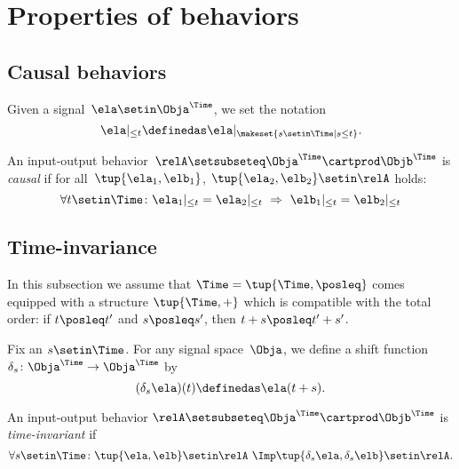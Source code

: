 
\section{Properties of behaviors}

\subsection{Causal behaviors}

Given a signal~$\ela \setin \Obja^\Time$, we set the notation
\begin{equation}
    \ela \vert_{\leq t} \definedas \ela \vert_{\makeset{ s \setin \Time \mid s \leq t}}.
\end{equation}

\begin{definition}\label{def:causal-io}
    An input-output behavior~$\relA \setsubseteq \Obja^\Time \cartprod \Objb^\Time$ is \emph{causal} if for all~$\tup{\ela_1, \elb_1}$, $\tup{\ela_2, \elb_2} \setin \relA$ holds:
    \begin{equation}
        \forall t \setin \Time\colon \ela_1 \vert_{ \leq t} = \ela_2 \vert_{ \leq t} \ \Rightarrow \ \elb_1 \vert_{ \leq t} = \elb_2 \vert_{ \leq t}
    \end{equation}
\end{definition}


\subsection{Time-invariance}

In this subsection we assume that $\Time = \tup{\Time, \posleq}$ comes equipped with a  structure $\tup{\Time, +}$ which is compatible with the total order: if $t \posleq t'$ and $s \posleq s'$, then $t + s \posleq t' + s'$.

Fix an $s \setin \Time$.
For any signal space~$\Obja$, we define a shift function~$\delta_s\colon \Obja^\Time \to \Obja^\Time$ by
\begin{equation}
    (\delta_s \ela)(t)
    \definedas \ela(t + s).
\end{equation}

\begin{definition}\label{def:behavior-time-invariant}
    An input-output behavior $\relA \setsubseteq \Obja^\Time \cartprod \Objb^\Time$ is \emph{time-invariant} if
    \begin{equation}
        \forall s \setin \Time\colon \tup{\ela, \elb} \setin \relA \ \Imp \tup{\delta_s \ela, \delta_s \elb} \setin \relA.
    \end{equation}
\end{definition}



